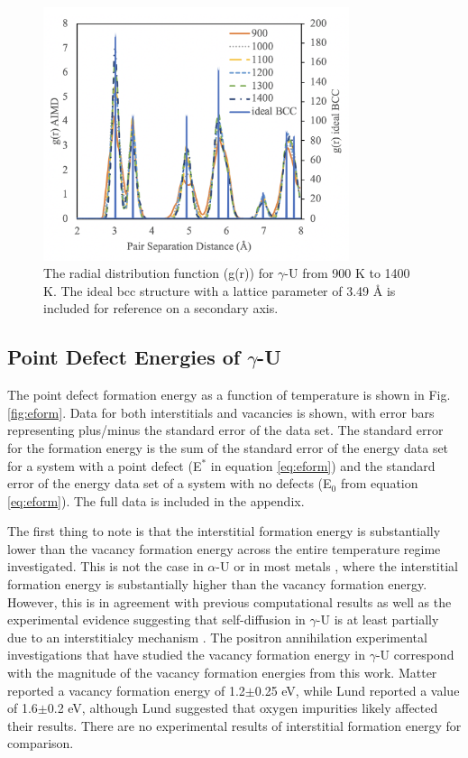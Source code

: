 \documentclass[review]{elsarticle}
\begin{document}
\begin{figure}[h]
 \centering
 \includegraphics[width=0.8\textwidth]{4_rdf.png} 
 \caption{The radial distribution function (g(r)) for $\gamma$-U from 900 K to 1400 K. The ideal bcc structure with a lattice parameter of 3.49 {\AA} is included for reference on a secondary axis.  }
 \label{fig:rdf}
\end{figure}

\FloatBarrier

\subsection{Point Defect Energies of $\gamma$-U}

The point defect formation energy as a function of temperature is shown in Fig. \ref{fig:eform}. Data for both interstitials and vacancies is shown, with error bars representing plus/minus the standard error of the data set. The standard error for the formation energy is the sum of the standard error of the energy data set for a system with a point defect (E$^*$ in equation \ref{eq:eform}) and the standard error of the energy data set of a system with no defects (E$_0$ from equation \ref{eq:eform}). The full data is included in the appendix.

The first thing to note is that the interstitial formation energy is substantially lower than the vacancy formation energy across the entire temperature regime investigated. This is not the case in $\alpha$-U \cite{wirth2011} or in most metals \cite{schultz1968, baskes1979, lee2001, lee2003}, where the interstitial formation energy is substantially higher than the vacancy formation energy. However, this is in agreement with previous computational results \cite{beeler2010} as well as the experimental evidence suggesting that self-diffusion in $\gamma$-U is at least partially due to an interstitialcy mechanism \cite{fedorov1978, smirnov1992, mehrer2011}. The positron annihilation experimental investigations that have studied the vacancy formation energy in $\gamma$-U correspond with the magnitude of the vacancy formation energies from this work. Matter \cite{matter1980} reported a vacancy formation energy of 1.2$\pm$0.25 eV, while Lund \cite{lund2013} reported a value of 1.6$\pm$0.2 eV, although Lund suggested that oxygen impurities likely affected their results. There are no experimental results of interstitial formation energy for comparison.
\end{document}
